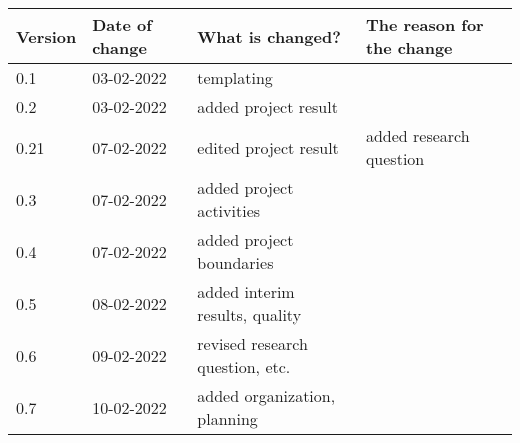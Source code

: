 \begin{tabular}{ | l | l | l | l |}
    \hline
    \textbf{Version} & \textbf{Date of change} & \textbf{What is changed?} & \textbf{The reason for the change} \\ \hline
    0.1 & 03-02-2022 & templating & \\
    0.2 & 03-02-2022 & added project result & \\
    0.21 & 07-02-2022 & edited project result & added research question\\
    0.3 & 07-02-2022 & added project activities &\\
    0.4 & 07-02-2022 & added project boundaries &\\
    0.5 & 08-02-2022 & added interim results, quality &\\
    0.6 & 09-02-2022 & revised research question, etc. &\\
    0.7 & 10-02-2022 & added organization, planning &\\
   
    \hline
\end{tabular}
